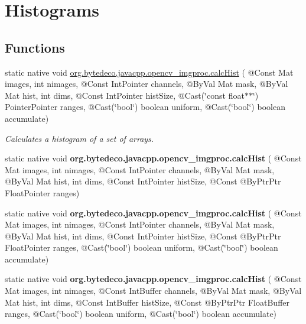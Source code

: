 \hypertarget{group__imgproc__hist}{}\section{Histograms}
\label{group__imgproc__hist}
\subsection*{Functions}
\begin{DoxyCompactItemize}
\item 
static native void \hyperlink{group__imgproc__hist_ga5d3d264cae4eeaf1ffac100661154b5a}{org.\+bytedeco.\+javacpp.\+opencv\+\_\+imgproc.\+calc\+Hist} ( @Const Mat images, int nimages, @Const Int\+Pointer channels, @By\+Val Mat mask, @By\+Val Mat hist, int dims, @Const Int\+Pointer hist\+Size, @Cast(\char`\"{}const float$\ast$$\ast$\char`\"{}) Pointer\+Pointer ranges, @Cast(\char`\"{}bool\char`\"{}) boolean uniform, @Cast(\char`\"{}bool\char`\"{}) boolean accumulate)
\begin{DoxyCompactList}\small\item\em Calculates a histogram of a set of arrays. \end{DoxyCompactList}\item 
\mbox{\label{group__imgproc__hist_gaceb265aae7d380ace4e1a9a25a4932dd}} 
static native void {\bfseries org.\+bytedeco.\+javacpp.\+opencv\+\_\+imgproc.\+calc\+Hist} ( @Const Mat images, int nimages, @Const Int\+Pointer channels, @By\+Val Mat mask, @By\+Val Mat hist, int dims, @Const Int\+Pointer hist\+Size, @Const @By\+Ptr\+Ptr Float\+Pointer ranges)
\item 
\mbox{\label{group__imgproc__hist_gadcdbf439ce211663d2d46970bc60b86a}} 
static native void {\bfseries org.\+bytedeco.\+javacpp.\+opencv\+\_\+imgproc.\+calc\+Hist} ( @Const Mat images, int nimages, @Const Int\+Pointer channels, @By\+Val Mat mask, @By\+Val Mat hist, int dims, @Const Int\+Pointer hist\+Size, @Const @By\+Ptr\+Ptr Float\+Pointer ranges, @Cast(\char`\"{}bool\char`\"{}) boolean uniform, @Cast(\char`\"{}bool\char`\"{}) boolean accumulate)
\item 
\mbox{\label{group__imgproc__hist_ga7f5f92e2727bbc0918a60e613dd95c49}} 
static native void {\bfseries org.\+bytedeco.\+javacpp.\+opencv\+\_\+imgproc.\+calc\+Hist} ( @Const Mat images, int nimages, @Const Int\+Buffer channels, @By\+Val Mat mask, @By\+Val Mat hist, int dims, @Const Int\+Buffer hist\+Size, @Const @By\+Ptr\+Ptr Float\+Buffer ranges, @Cast(\char`\"{}bool\char`\"{}) boolean uniform, @Cast(\char`\"{}bool\char`\"{}) boolean accumulate)
$$
\end{DoxyCompactItemize}
